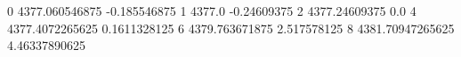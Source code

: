 0 4377.060546875 -0.185546875
1 4377.0 -0.24609375
2 4377.24609375 0.0
4 4377.4072265625 0.1611328125
6 4379.763671875 2.517578125
8 4381.70947265625 4.46337890625
